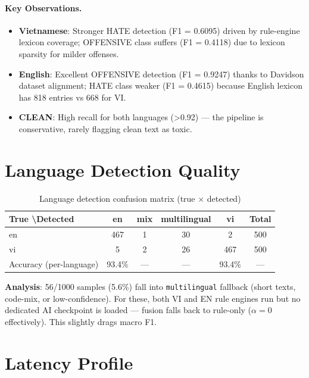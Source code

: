 \documentclass[11pt,a4paper]{article}
\begin{document}
\paragraph{Key Observations.}
\begin{itemize}
    \item \textbf{Vietnamese}: Stronger HATE detection (F1 = 0.6095) driven by rule-engine lexicon coverage; OFFENSIVE class suffers (F1 = 0.4118) due to lexicon sparsity for milder offenses.
    \item \textbf{English}: Excellent OFFENSIVE detection (F1 = 0.9247) thanks to Davidson dataset alignment; HATE class weaker (F1 = 0.4615) because English lexicon has 818 entries vs 668 for VI.
    \item \textbf{CLEAN}: High recall for both languages (>0.92) --- the pipeline is conservative, rarely flagging clean text as toxic.
\end{itemize}

\section{Language Detection Quality}

\begin{table}[H]
\centering
\caption{Language detection confusion matrix (true $\times$ detected)}
\label{tab:lang_det}
\begin{tabular}{lccccc}
\toprule
True \textbackslash Detected & en & mix & multilingual & vi & Total \\
\midrule
en     & 467 & 1 & 30 & 2 & 500 \\
vi     & 5   & 2 & 26 & 467 & 500 \\
\midrule
Accuracy (per-language) & 93.4\% & --- & --- & 93.4\% & --- \\
\bottomrule
\end{tabular}
\end{table}

\textbf{Analysis}: 56/1000 samples (5.6\%) fall into \texttt{multilingual} fallback (short texts, code-mix, or low-confidence). For these, both VI and EN rule engines run but no dedicated AI checkpoint is loaded --- fusion falls back to rule-only ($\alpha = 0$ effectively). This slightly drags macro F1.

\section{Latency Profile}
\label{sec:latency}
\end{document}
